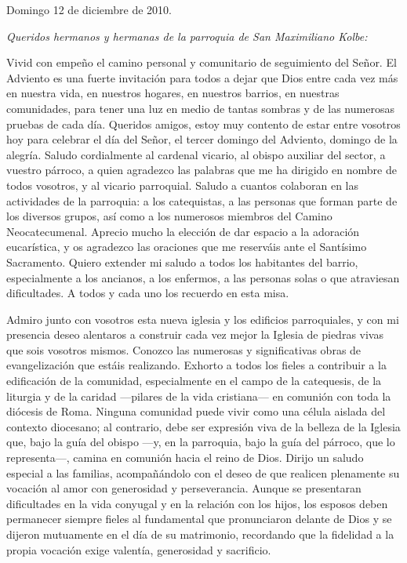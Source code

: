 \begin{body}
\begin{body}
Domingo 12 de diciembre de 2010.

\emph{Queridos hermanos y hermanas de la parroquia de San Maximiliano Kolbe:}

Vivid con empeño el camino personal y comunitario de seguimiento del Señor. El Adviento es una fuerte invitación para todos a dejar que Dios entre cada vez más en nuestra vida, en nuestros hogares, en nuestros barrios, en nuestras comunidades, para tener una luz en medio de tantas sombras y de las numerosas pruebas de cada día. Queridos amigos, estoy muy contento de estar entre vosotros hoy para celebrar el día del Señor, el tercer domingo del Adviento, domingo de la alegría. Saludo cordialmente al cardenal vicario, al obispo auxiliar del sector, a vuestro párroco, a quien agradezco las palabras que me ha dirigido en nombre de todos vosotros, y al vicario parroquial. Saludo a cuantos colaboran en las actividades de la parroquia: a los catequistas, a las personas que forman parte de los diversos grupos, así como a los numerosos miembros del Camino Neocatecumenal. Aprecio mucho la elección de dar espacio a la adoración eucarística, y os agradezco las oraciones que me reserváis ante el Santísimo Sacramento. Quiero extender mi saludo a todos los habitantes del barrio, especialmente a los ancianos, a los enfermos, a las personas solas o que atraviesan dificultades. A todos y cada uno los recuerdo en esta misa.

Admiro junto con vosotros esta nueva iglesia y los edificios parroquiales, y con mi presencia deseo alentaros a construir cada vez mejor la Iglesia de piedras vivas que sois vosotros mismos. Conozco las numerosas y significativas obras de evangelización que estáis realizando. Exhorto a todos los fieles a contribuir a la edificación de la comunidad, especialmente en el campo de la catequesis, de la liturgia y de la caridad ---pilares de la vida cristiana--- en comunión con toda la diócesis de Roma. Ninguna comunidad puede vivir como una célula aislada del contexto diocesano; al contrario, debe ser expresión viva de la belleza de la Iglesia que, bajo la guía del obispo ---y, en la parroquia, bajo la guía del párroco, que lo representa---, camina en comunión hacia el reino de Dios. Dirijo un saludo especial a las familias, acompañándolo con el deseo de que realicen plenamente su vocación al amor con generosidad y perseverancia. Aunque se presentaran dificultades en la vida conyugal y en la relación con los hijos, los esposos deben permanecer siempre fieles al fundamental  que pronunciaron delante de Dios y se dijeron mutuamente en el día de su matrimonio, recordando que la fidelidad a la propia vocación exige valentía, generosidad y sacrificio.


\end{body}
\end{body}

